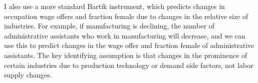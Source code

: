 \documentclass[12pt]{article}
\begin{document}







I also use a more standard Bartik instrument, which predicts changes in occupation wage offers and fraction female due to changes in the relative size of industries. For example, if manufacturing is declining, the number of administrative assistants who work in manufacturing will decrease, and we can use this to predict changes in the wage offer and fraction female of administrative assistants. The key identifying assumption is that changes in the prominence of certain industries due to production technology or demand side factors, not labor supply changes.


\end{document}
